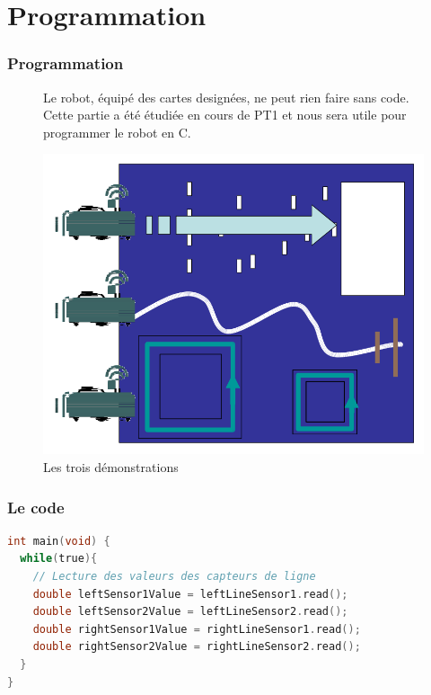 \section{Programmation}

\begin{frame}
    \frametitle{Programmation}
    \begin{figure}[H]
        \centering
        \begin{minipage}{.5\textwidth}
            \centering
            Le robot, équipé des cartes designées, ne peut rien faire sans code. Cette partie a été étudiée en cours de PT1 et nous sera utile pour programmer le robot en C.
        \end{minipage}%
        \begin{minipage}{.5\textwidth}
            \centering
            \includegraphics[width=.7\linewidth]{Images/programmes.png}
            \caption{Les trois démonstrations}
            \label{fig:programmes}
        \end{minipage}%
    \end{figure}

\footer{\hfill\insertframenumber/\inserttotalframenumber}
\end{frame}

\begin{frame}[fragile]
\frametitle{Le code}
\begin{lstlisting}[language=C, caption=Lecture des données capteur (vu en PT1)]
int main(void) {
  while(true){
    // Lecture des valeurs des capteurs de ligne
    double leftSensor1Value = leftLineSensor1.read();
    double leftSensor2Value = leftLineSensor2.read();
    double rightSensor1Value = rightLineSensor1.read();
    double rightSensor2Value = rightLineSensor2.read();
  }
}
\end{lstlisting}

\footer{\hfill\insertframenumber/\inserttotalframenumber}
\end{frame}